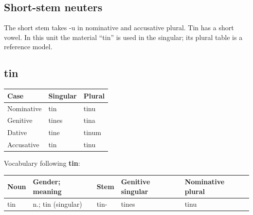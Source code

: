 \subsection*{Short-stem neuters}

The short stem takes -u in nominative and accusative plural. Tin has a short vowel. In this unit the material “tin” is used in the singular; its plural table is a reference model.

\subsection*{tin}

\par\begingroup
\fontsize{10.5}{13.2}\selectfont
\setlength{\LTleft}{0pt}\setlength{\LTright}{\fill}
\noindent
\begin{tabular}{@{}>{\raggedright\arraybackslash}p{39.46mm}>{\raggedright\arraybackslash}p{39.46mm}>{\raggedright\arraybackslash}p{39.46mm}@{}}
\toprule
\textbf{Case} & \textbf{Singular} & \textbf{Plural} \\
\midrule
Nominative & tin & tinu \\
Genitive & tines & tina \\
Dative & tine & tinum \\
Accusative & tin & tinu \\
\bottomrule
\end{tabular}
\par\endgroup

Vocabulary following \textbf{tin}:

\par\begingroup
\fontsize{10.5}{13.2}\selectfont
\setlength{\LTleft}{0pt}\setlength{\LTright}{\fill}
\noindent
\begin{tabular}{@{}>{\raggedright\arraybackslash}p{19.18mm}>{\raggedright\arraybackslash}p{26.08mm}>{\raggedright\arraybackslash}p{19.18mm}>{\raggedright\arraybackslash}p{23.11mm}>{\raggedright\arraybackslash}p{25.22mm}@{}}
\toprule
\textbf{Noun} & \textbf{Gender; meaning} & \textbf{Stem} & \textbf{Genitive singular} & \textbf{Nominative plural} \\
\midrule
tin & n.; tin (singular) & tin- & tines & tinu \\
\bottomrule
\end{tabular}
\par\endgroup

